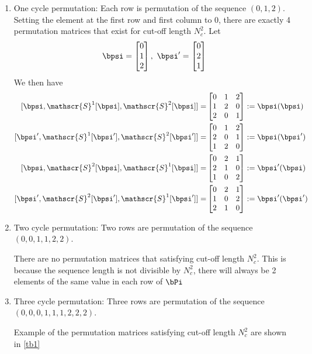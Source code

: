 \begin{enumerate}
	\item One cycle permutation: Each row is permutation of the sequence $(0,1,2)$. Setting the element at the first row and first column to $0$, there are exactly 4 permutation matrices that exist for cut-off length $N_c^2$.
	Let
	\begin{equation*}
	\bpsi=\begin{bmatrix} 0\cr 1\cr 2\cr \end{bmatrix},~
	\bpsi'=\begin{bmatrix} 0\cr 2\cr 1\cr \end{bmatrix}
	\end{equation*}
We then have 
	\begin{equation}
	\begin{split}
	[\bpsi,\mathscr{S}^1[\bpsi],\mathscr{S}^2[\bpsi]]=
	&
	\begin{bmatrix}
	0 & 1 & 2\cr
	1 & 2 & 0\cr
	2 & 0 & 1
	\end{bmatrix}:=\bpsi(\bpsi) \\
	[\bpsi',\mathscr{S}^1[\bpsi'],\mathscr{S}^2[\bpsi']]=
	&
	\begin{bmatrix}
	0 & 1 & 2\cr
	2 & 0 & 1\cr
	1 & 2 & 0
	\end{bmatrix}:=\bpsi(\bpsi')\\
	[\bpsi,\mathscr{S}^2[\bpsi],\mathscr{S}^1[\bpsi]]=
	&
	\begin{bmatrix}
	0 & 2 & 1\cr
	2 & 1 & 0\cr
	1 & 0 & 2
	\end{bmatrix}:=\bpsi'(\bpsi)\\
	[\bpsi',\mathscr{S}^2[\bpsi'],\mathscr{S}^1[\bpsi']]=
	&
	\begin{bmatrix}
	0 & 2 & 1\cr
	1 & 0 & 2\cr
	2 & 1 & 0
	\end{bmatrix}:=\bpsi'(\bpsi')\\
	\end{split}
	\end{equation}
	
	
	\item Two cycle permutation: Two rows are permutation of the sequence $(0,0,1,1,2,2)$.
	
	There are no permutation matrices that satisfying cut-off length $N_c^2$. This is because the sequence length is not divisible by $N_c^2$, there will always be 2 elements of the same value in each row of $\bPi$
	
	
	\item Three cycle permutation: Three rows are permutation of the sequence$(0,0,0,1,1,1,2,2,2)$. 
	
	Example of the permutation matrices satisfying cut-off length $N_c^2$ are shown in \ref{tb1}
	
	
\end{enumerate}





